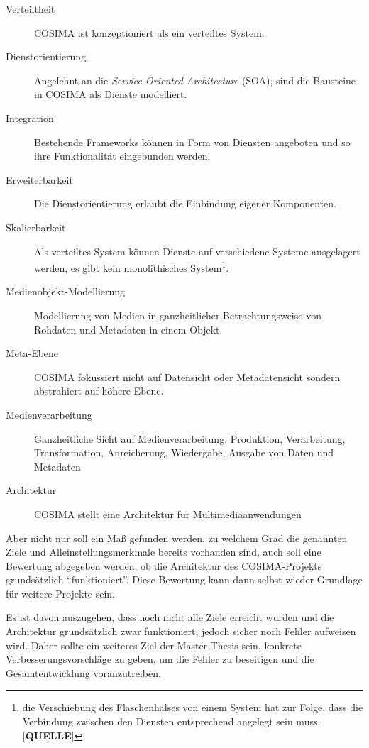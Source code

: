   \begin{description}
  	\item[Verteiltheit] COSIMA ist konzeptioniert als ein verteiltes System.
  	\item[Dienstorientierung] Angelehnt an die \emph{Service-Oriented Architecture} (SOA), sind die Bausteine in COSIMA als Dienste modelliert.
  	\item[Integration] Bestehende Frameworks können in Form von Diensten angeboten und so ihre Funktionalität eingebunden werden.
  	\item[Erweiterbarkeit] Die Dienstorientierung erlaubt die Einbindung eigener Komponenten.
  	\item[Skalierbarkeit] Als verteiltes System können Dienste auf verschiedene Systeme ausgelagert werden, es gibt kein monolithisches System\footnote{die Verschiebung des Flaschenhalses von einem System hat zur Folge, dass die Verbindung zwischen den Diensten entsprechend angelegt sein muss. [\textbf{QUELLE}]}.
  	\item[Medienobjekt-Modellierung] Modellierung von Medien in ganzheitlicher Betrachtungsweise von Rohdaten und Metadaten in einem Objekt.
  	\item[Meta-Ebene] COSIMA fokussiert nicht auf Datensicht oder Metadatensicht sondern abstrahiert auf höhere Ebene.
  	\item[Medienverarbeitung] Ganzheitliche Sicht auf Medienverarbeitung: Produktion, Verarbeitung, Transformation, Anreicherung, Wiedergabe, Ausgabe von Daten und Metadaten
  	\item[Architektur] COSIMA stellt eine Architektur für Multimediaanwendungen
  \end{description}
  
  Aber nicht nur soll ein Maß gefunden werden, zu welchem Grad die genannten Ziele und Alleinstellungsmerkmale bereits vorhanden sind, auch soll eine Bewertung abgegeben werden, ob die Architektur des COSIMA-Projekts grundsätzlich "`funktioniert"'. Diese Bewertung kann dann selbst wieder Grundlage für weitere Projekte sein.
  
  Es ist davon auszugehen, dass noch nicht alle Ziele erreicht wurden und die Architektur grundsätzlich zwar funktioniert, jedoch sicher noch Fehler aufweisen wird. Daher sollte ein weiteres Ziel der Master Thesis sein, konkrete Verbesserungsvorschläge zu geben, um die Fehler zu beseitigen und die Gesamtentwicklung voranzutreiben.
  

